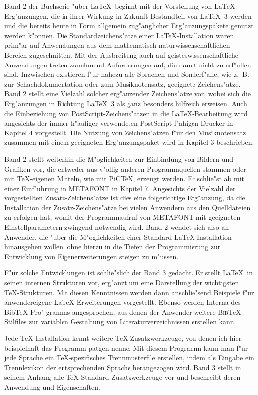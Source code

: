 \documentclass[twoside]{article}
\begin{document}
Band 2 der Buchserie "uber \LaTeX\ beginnt mit der Vorstellung von 
\LaTeX-Erg"anzungen, die in ihrer Wirkung in Zukunft Bestandteil von
\LaTeX~3 werden und die bereits heute in Form allgemein zug"anglicher
Erg"anzungspakete genutzt werden k"onnen. Die Standardzeichens"atze einer
\LaTeX-Installation waren prim"ar auf Anwendungen aus dem
mathematisch-naturwissenschaftlichen Bereich zugeschnitten. 
Mit der Ausbreitung auch auf geisteswissenschaftliche Anwendungen treten
zunehmend Anforderungen auf, die damit nicht zu erf"ullen sind. Inzwischen
existieren f"ur nahezu alle Sprachen und Sonderf"alle, wie z.~B. zur
Schachdokumentation oder zum Musiknotensatz, geeignete Zeichens"atze.
Band 2 stellt eine Vielzahl solcher erg"anzender Zeichens"atze vor, wobei sich
die Erg"anzungen in Richtung \LaTeX~3 als ganz besonders hilfreich erweisen.
Auch die Einbeziehung von PostScript-Zeichens"atzen in die \LaTeX-Bearbeitung
wird angesichts der immer h"aufiger verwendeten PostScript-f"ahigen Drucker
in Kapitel 4 vorgestellt. Die Nutzung von Zeichens"atzen f"ur den Musiknotensatz
zusammen mit einem geeigneten Erg"anzungspaket wird in  Kapitel 3 beschrieben. 

Band 2 stellt weiterhin die M"oglichkeiten zur Einbindung von Bildern und
Grafiken vor, die entweder aus v"ollig anderen Programmquellen stammen oder
mit \TeX-eigenen Mitteln, wie mit PiC\TeX, erzeugt werden.
Er schlie"st ab mit einer Einf"uhrung in METAFONT in Kapitel 7. Angesichts der
Vielzahl der vorgestellten Zusatz-Zeichens"atze ist dies eine folgerichtige
Erg"anzung, da die Installation der Zusatz-Zeichens"atze bei vielen Anwendern
aus den Quelldateien zu erfolgen hat, womit der Programmaufruf von METAFONT
mit geeigneten Einstellparametern zwingend notwendig wird.
Band 2 wendet sich also an Anwender, die "uber die M"oglichkeiten 
einer Standard-\LaTeX-Installation hinausgehen wollen, ohne hierzu
in die Tiefen der Programmierung zur Entwicklung von Eigenerweiterungen
steigen zu m"ussen.

F"ur solche Entwicklungen ist schlie"slich der Band 3 gedacht. Er stellt
\LaTeX\ in seinen internen Strukturen vor, erg"anzt um eine Darstellung
der wichtigsten \TeX-Strukturen. Mit diesen Kenntnissen werden dann
anschlie"send Beispiele f"ur anwendereigene \LaTeX-Erweiterungen vorgestellt.
Ebenso werden Interna des Bib\TeX-Pro"-gramms angesprochen, aus denen
der Anwender weitere \textsc{Bib}\TeX-Stilfiles zur variablen Gestaltung
von Literaturverzeichnissen erstellen kann.

Jede \TeX-Installation kennt weitere  \TeX-Zusatzwerkzeuge, von denen ich hier
beispielhaft das Programm patgen nenne. Mit diesem Programm kann man
f"ur jede Sprache ein \TeX-spezifisches Trennmusterfile erstellen,
indem als Eingabe ein Trennlexikon der entsprechenden Sprache herangezogen
wird. Band 3 stellt in seinem Anhang alle \TeX-Standard-Zusatzwerkzeuge vor und
beschreibt deren Anwendung und Eigenschaften.
\end{document}
